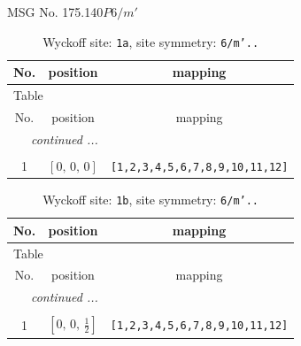 \documentclass[fleqn,8pt]{jsarticle}
\begin{document}
\setcounter{MaxMatrixCols}{32}

\renewcommand{\tablename}{Table~}
\renewcommand{\figurename}{Figure~}
\begin{center}
\LARGE
MSG No. 175.140\quad$P6/m'$
\end{center}
\renewcommand{\arraystretch}{1.2}
\begin{longtable}{ccc}
\caption{Wyckoff site: {\tt 1a}, site symmetry: {\tt 6/m'..}}
 \\
 \hline \hline
No. & position & mapping \\ \hline \endfirsthead

\multicolumn{2}{l}{\tablename\ \thetable{}} \\
 \hline \hline
No. & position & mapping \\ \hline \endhead

 \hline \hline
\multicolumn{2}{r}{\footnotesize\it continued ...} \\ \endfoot

 \hline \hline
\multicolumn{2}{r}{} \\ \endlastfoot

1 & $\left[ 0,\, 0,\, 0 \right]$ & {\tt [1,2,3,4,5,6,7,8,9,10,11,12]} \\
\end{longtable}
\renewcommand{\arraystretch}{1.2}
\begin{longtable}{ccc}
\caption{Wyckoff site: {\tt 1b}, site symmetry: {\tt 6/m'..}}
 \\
 \hline \hline
No. & position & mapping \\ \hline \endfirsthead

\multicolumn{2}{l}{\tablename\ \thetable{}} \\
 \hline \hline
No. & position & mapping \\ \hline \endhead

 \hline \hline
\multicolumn{2}{r}{\footnotesize\it continued ...} \\ \endfoot

 \hline \hline
\multicolumn{2}{r}{} \\ \endlastfoot

1 & $\left[ 0,\, 0,\, \frac{1}{2} \right]$ & {\tt [1,2,3,4,5,6,7,8,9,10,11,12]} \\
\end{longtable}
\renewcommand{\arraystretch}{1.2}
\end{document}
